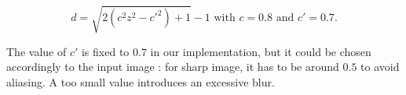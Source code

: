 \begin{equation*}
d=\sqrt{2(c^2 z^2 - c'^2)+1}-1 \text{ with } c=0.8 \text{ and } c'=0.7.
\end{equation*}

The value of $c'$ is fixed to $0.7$ in our implementation, but it could be chosen accordingly to the input image : for sharp image, it has to be around $0.5$ to avoid aliasing. A too small value introduces an excessive blur.



